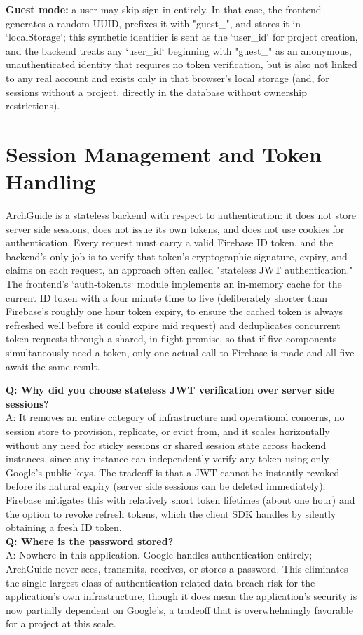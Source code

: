 \documentclass[11pt,a4paper]{report}
\begin{document}
\textbf{Guest mode:} a user may skip sign in entirely. In that case, the frontend generates a random UUID, prefixes it with "guest\_", and stores it in `localStorage`; this synthetic identifier is sent as the `user_id` for project creation, and the backend treats any `user_id` beginning with "guest\_" as an anonymous, unauthenticated identity that requires no token verification, but is also not linked to any real account and exists only in that browser's local storage (and, for sessions without a project, directly in the database without ownership restrictions).

\section{Session Management and Token Handling}

ArchGuide is a stateless backend with respect to authentication: it does not store server side sessions, does not issue its own tokens, and does not use cookies for authentication. Every request must carry a valid Firebase ID token, and the backend's only job is to verify that token's cryptographic signature, expiry, and claims on each request, an approach often called "stateless JWT authentication." The frontend's `auth-token.ts` module implements an in-memory cache for the current ID token with a four minute time to live (deliberately shorter than Firebase's roughly one hour token expiry, to ensure the cached token is always refreshed well before it could expire mid request) and deduplicates concurrent token requests through a shared, in-flight promise, so that if five components simultaneously need a token, only one actual call to Firebase is made and all five await the same result.

\begin{qabox}
\textbf{Q: Why did you choose stateless JWT verification over server side sessions?} \\
A: It removes an entire category of infrastructure and operational concerns, no session store to provision, replicate, or evict from, and it scales horizontally without any need for sticky sessions or shared session state across backend instances, since any instance can independently verify any token using only Google's public keys. The tradeoff is that a JWT cannot be instantly revoked before its natural expiry (server side sessions can be deleted immediately); Firebase mitigates this with relatively short token lifetimes (about one hour) and the option to revoke refresh tokens, which the client SDK handles by silently obtaining a fresh ID token. \\[4pt]
\textbf{Q: Where is the password stored?} \\
A: Nowhere in this application. Google handles authentication entirely; ArchGuide never sees, transmits, receives, or stores a password. This eliminates the single largest class of authentication related data breach risk for the application's own infrastructure, though it does mean the application's security is now partially dependent on Google's, a tradeoff that is overwhelmingly favorable for a project at this scale.
\end{qabox}
\end{document}
